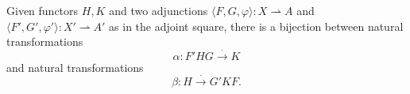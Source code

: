 Given functors $H, K$ and two adjunctions $\langle F, G, \varphi \rangle : X \rightharpoonup A$ and $\langle F', G', \varphi' \rangle : X' \rightharpoonup A'$ as in the adjoint square, there is a bijection between natural transformations
$$\alpha : F'HG \xrightarrow{\cdot} K$$
and natural transformations
$$\beta : H \xrightarrow{\cdot} G'KF.$$
